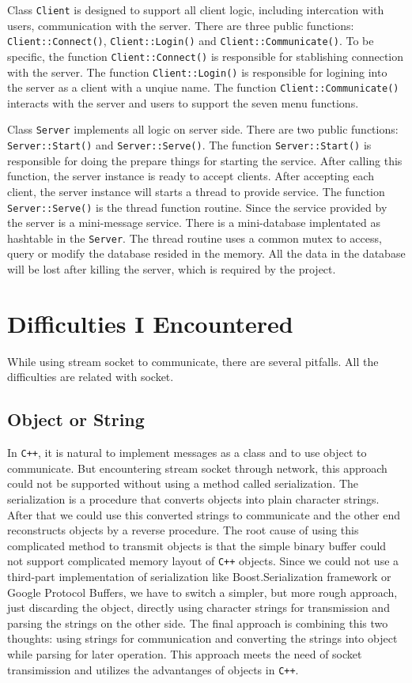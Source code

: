 \documentclass[a4paper]{report}
\begin{document}
\noindent Class \lstinline{Client} is designed to support all client logic, including intercation with users, communication with the server. There are three public functions: \lstinline{Client::Connect()}, \lstinline{Client::Login()} and \lstinline{Client::Communicate()}. To be specific, the function \lstinline{Client::Connect()} is responsible for stablishing connection with the server. The function \lstinline{Client::Login()} is responsible for logining into the server as a client with a unqiue name. The function \lstinline{Client::Communicate()} interacts with the server and users to support the seven menu functions.

\noindent Class \lstinline{Server} implements all logic on server side. There are two public functions: \lstinline{Server::Start()} and \lstinline{Server::Serve()}. The function \lstinline{Server::Start()} is responsible for doing the prepare things for starting the service. After calling this function, the server instance is ready to accept clients. After accepting each client, the server instance will starts a thread to provide service. The function \lstinline{Server::Serve()} is the thread function routine. Since the service provided by the server is a mini-message service. There is a mini-database implentated as hashtable in the \lstinline{Server}. The thread routine uses a common mutex to access, query or modify the database resided in the memory. All the data in the database will be lost after killing the server, which is required by the project.

\section*{Difficulties I Encountered}
While using stream socket to communicate, there are several pitfalls. All the difficulties are related with socket.

\subsection*{Object or String}
In \lstinline{C++}, it is natural to implement messages as a class and to use object to communicate. But encountering stream socket through network, this approach could not be supported without using a method called serialization. The serialization is a procedure that converts objects into plain character strings. After that we could use this converted strings to communicate and the other end reconstructs objects by a reverse procedure. The root cause of using this complicated method to transmit objects is that the simple binary buffer could not support complicated memory layout of \lstinline{C++} objects. Since we could not use a third-part implementation of serialization like Boost.Serialization framework or Google Protocol Buffers, we have to switch a simpler, but more rough approach, just discarding the object, directly using character strings for transmission and parsing the strings on the other side. The final approach is combining this two thoughts: using strings for communication and converting the strings into object while parsing for later operation. This approach meets the need of socket transimission and utilizes the advantanges of objects in \lstinline{C++}.
\end{document}
